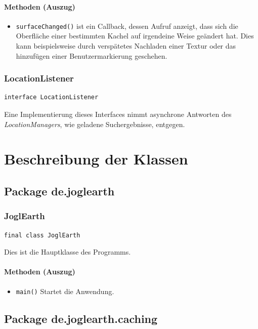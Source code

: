 \documentclass[10pt]{scrreprt}
\begin{document}
\subsubsection*{Methoden (Auszug)}
\begin{itemize}
\item \texttt{surfaceChanged()} ist ein Callback, dessen Aufruf anzeigt, dass sich die Oberfläche einer bestimmten Kachel auf irgendeine Weise geändert hat. Dies kann beispielsweise durch verspätetes Nachladen einer Textur oder das hinzufügen einer Benutzermarkierung geschehen.
\end{itemize}


\vspace{5mm}
\subsection*{LocationListener}
\begin{lstlisting}
interface LocationListener
\end{lstlisting}
Eine Implementierung dieses Interfaces nimmt asynchrone Antworten des \textit{LocationManagers}, wie geladene Suchergebnisse, entgegen.\\




\chapter{Beschreibung der Klassen}
\section{Package de.joglearth}
\subsection*{JoglEarth}
\begin{lstlisting}
final class JoglEarth
\end{lstlisting}
Dies ist die Hauptklasse des Programms.\\
\subsubsection*{Methoden (Auszug)}
\begin{itemize}\item\texttt{main()} Startet die Anwendung.
\end{itemize}


\vspace{5mm}
\section{Package de.joglearth.caching}
\end{document}
